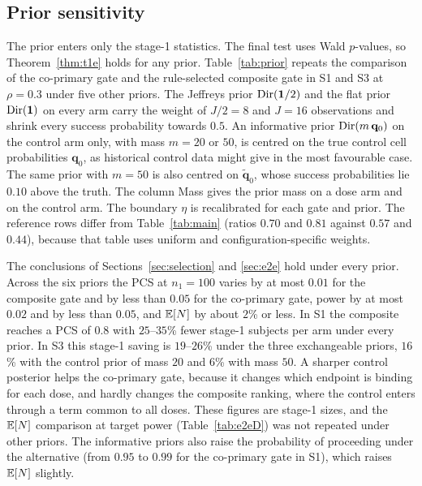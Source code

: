 \subsection{Prior sensitivity}\label{sec:prior}

The prior enters only the stage-1 statistics. The final test uses Wald $p$-values, so Theorem~\ref{thm:t1e} holds for any prior. Table~\ref{tab:prior} repeats the comparison of the co-primary gate and the rule-selected composite gate in S1 and S3 at $\rho=0.3$ under five other priors. The Jeffreys prior $\mathrm{Dir}(\mathbf 1/2)$ and the flat prior $\mathrm{Dir}(\mathbf 1)$ on every arm carry the weight of $J/2=8$ and $J=16$ observations and shrink every success probability towards $0.5$. An informative prior $\mathrm{Dir}(m\,\mathbf q_0)$ on the control arm only, with mass $m=20$ or $50$, is centred on the true control cell probabilities $\mathbf q_0$, as historical control data might give in the most favourable case. The same prior with $m=50$ is also centred on $\tilde{\mathbf q}_0$, whose success probabilities lie $0.10$ above the truth. The column Mass gives the prior mass on a dose arm and on the control arm. The boundary $\eta$ is recalibrated for each gate and prior. The reference rows differ from Table~\ref{tab:main} (ratios $0.70$ and $0.81$ against $0.57$ and $0.44$), because that table uses uniform and configuration-specific weights.

\begin{table}
\centering\footnotesize
\caption{Prior sensitivity at $\rho=0.3$: stage-1 size at a PCS of $0.8$ and, at $n_1=100$ and $n_{\mathrm{tot}}=350$, PCS, power and $\E[N]$ for the co-primary gate (M) and the rule-selected composite gate (C).}\label{tab:prior}

\end{table}

The conclusions of Sections~\ref{sec:selection} and \ref{sec:e2e} hold under every prior. Across the six priors the PCS at $n_1=100$ varies by at most $0.01$ for the composite gate and by less than $0.05$ for the co-primary gate, power by at most $0.02$ and by less than $0.05$, and $\E[N]$ by about $2$\% or less. In S1 the composite reaches a PCS of $0.8$ with $25$--$35$\% fewer stage-1 subjects per arm under every prior. In S3 this stage-1 saving is $19$--$26$\% under the three exchangeable priors, $16$\% with the control prior of mass $20$ and $6$\% with mass $50$. A sharper control posterior helps the co-primary gate, because it changes which endpoint is binding for each dose, and hardly changes the composite ranking, where the control enters through a term common to all doses. These figures are stage-1 sizes, and the $\E[N]$ comparison at target power (Table~\ref{tab:e2eD}) was not repeated under other priors. The informative priors also raise the probability of proceeding under the alternative (from $0.95$ to $0.99$ for the co-primary gate in S1), which raises $\E[N]$ slightly.

